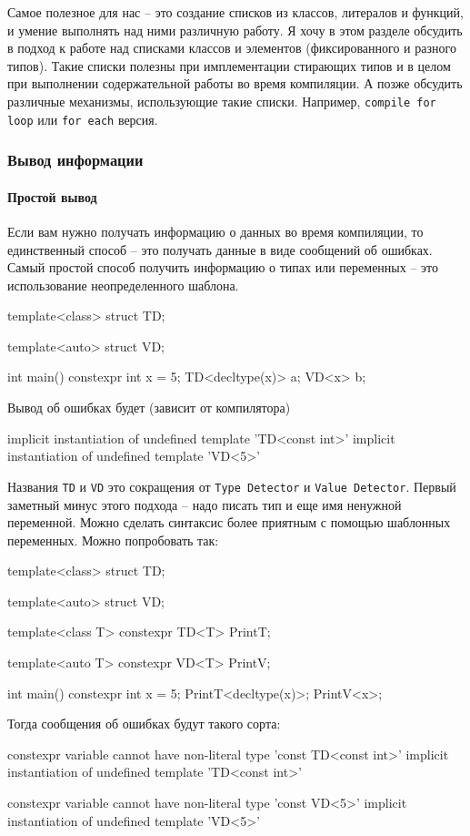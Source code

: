 Самое полезное для нас -- это создание списков из классов, литералов и функций, и умение выполнять над ними различную работу.
Я хочу в этом разделе обсудить в подход к работе над списками классов и элементов (фиксированного и разного типов).
Такие списки полезны при имплементации стирающих типов и в целом при выполнении содержательной работы во время компиляции.
А позже обсудить различные механизмы, использующие такие списки.
Например, \verb"compile for loop" или \verb"for each" версия.

\subsubsection{Вывод информации}
\label{section::ErrorPrint}

\paragraph{Простой вывод}

Если вам нужно получать информацию о данных во время компиляции, то единственный способ -- это получать данные в виде сообщений об ошибках.
Самый простой способ получить информацию о типах или переменных -- это использование неопределенного шаблона.
\begin{cppcode}
template<class>
struct TD;

template<auto>
struct VD;

int main() {
  constexpr int x = 5;
  TD<decltype(x)> a;
  VD<x> b;
}
\end{cppcode}
Вывод об ошибках будет (зависит от компилятора)
\begin{cppcode}
implicit instantiation of undefined template 'TD<const int>'
implicit instantiation of undefined template 'VD<5>'
\end{cppcode}
Названия \verb"TD" и \verb"VD" это сокращения от \verb"Type Detector" и \verb"Value Detector".
Первый заметный минус этого подхода -- надо писать тип и еще имя ненужной переменной.
Можно сделать синтаксис более приятным с помощью шаблонных переменных.
Можно попробовать так:
\begin{cppcode}
template<class>
struct TD;

template<auto>
struct VD;

template<class T>
constexpr TD<T> PrintT;

template<auto T>
constexpr VD<T> PrintV;

int main() {
  constexpr int x = 5;
  PrintT<decltype(x)>;
  PrintV<x>;
}
\end{cppcode}
Тогда сообщения об ошибках будут такого сорта:
\begin{cppcode}
constexpr variable cannot have non-literal type 'const TD<const int>'
implicit instantiation of undefined template 'TD<const int>'

constexpr variable cannot have non-literal type 'const VD<5>'
implicit instantiation of undefined template 'VD<5>'
\end{cppcode}

